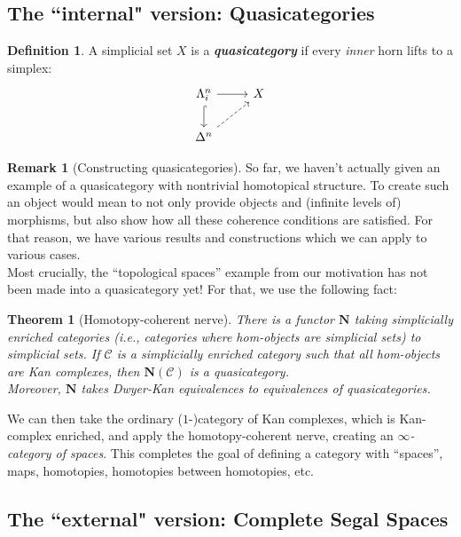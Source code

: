 \documentclass{article}
\newcommand{\textbi}[1]{\textbf{\textit{#1}}}
\newcommand{\C}{\mathscr{C}}
\newtheorem{thm}[subsection]{Theorem}
\theoremstyle{definition}
\newtheorem{defin}[subsection]{Definition}
\newtheorem{rem}[subsection]{Remark}
\begin{document}
\subsection*{The ``internal" version: Quasicategories}

\begin{defin}
    A simplicial set $X$ is a \textbi{quasicategory} if every \textit{inner} horn lifts to a simplex: 
    \[\begin{tikzcd}
        \Lambda^n_i\arrow[r] & X \\ 
        \Delta^n \arrow[from=u, hook] \arrow[ur, dashed]
    \end{tikzcd}\]
\end{defin}

\begin{rem}[Constructing quasicategories]
    So far, we haven't actually given an example of a quasicategory with nontrivial homotopical structure. To create such an object would mean to not only provide objects and (infinite levels of) morphisms, but also show how all these coherence conditions are satisfied. For that reason, we have various results and constructions which we can apply to various cases. \\ 
    Most crucially, the ``topological spaces'' example from our motivation has not been made into a quasicategory yet! For that, we use the following fact: 
    \begin{thm}[Homotopy-coherent nerve]
        There is a functor $\mathbf{N}$ taking simplicially enriched categories (i.e., categories where hom-objects are simplicial sets) to simplicial sets. If $\C$ is a simplicially enriched category such that all hom-objects are Kan complexes, then $\mathbf{N}(\C)$ is a quasicategory. 
        \\ 
        Moreover, $\mathbf{N}$ takes Dwyer-Kan equivalences to equivalences of quasicategories.
    \end{thm}
    We can then take the ordinary ($1$-)category of Kan complexes, which is Kan-complex enriched, and apply the homotopy-coherent nerve, creating an \textit{$\infty$-category of spaces}. This completes the goal of defining a category with ``spaces'', maps, homotopies, homotopies between homotopies, etc.
\end{rem}

\subsection*{The ``external" version: Complete Segal Spaces}
\end{document}
